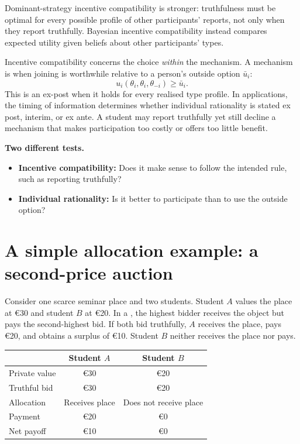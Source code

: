 Dominant-strategy incentive compatibility is stronger: truthfulness must be
optimal for every possible profile of other participants' reports, not only
when they report truthfully. Bayesian incentive compatibility instead compares
expected utility given beliefs about other participants' types.

Incentive compatibility concerns the choice \emph{within} the mechanism. A
mechanism is  when joining is worthwhile
relative to a person's outside option \(\bar u_i\):
\[
u_i(\theta_i,\theta_i,\theta_{-i})\geq\bar u_i.
\]
This is an ex-post  when it holds for every
realised type profile. In applications, the timing of information determines
whether individual rationality is stated ex post, interim, or ex ante. A
student may report truthfully yet still decline a mechanism that makes
participation too costly or offers too little benefit.

\begin{keyidea}
\textbf{Two different tests.}
\begin{itemize}
  \item \textbf{Incentive compatibility:} Does it make sense to follow the intended rule, such as reporting truthfully?
  \item \textbf{Individual rationality:} Is it better to participate than to use the outside option?
\end{itemize}
\end{keyidea}

\section{A simple allocation example: a second-price auction}

Consider one scarce seminar place and two students. Student \(A\) values the
place at \euro30 and student \(B\) at \euro20. In a
, the highest bidder receives the object but
pays the second-highest bid. If both bid truthfully, \(A\) receives the place,
pays \euro20, and obtains a surplus of \euro10. Student \(B\) neither receives
the place nor pays.

\begin{center}
\renewcommand{\arraystretch}{1.2}
\begin{tabular}{lcc}
  \toprule
  & Student \(A\) & Student \(B\)\\
  \midrule
  Private value & \euro30 & \euro20\\
  Truthful bid & \euro30 & \euro20\\
  Allocation & Receives place & Does not receive place\\
  Payment & \euro20 & \euro0\\
  Net payoff & \euro10 & \euro0\\
  \bottomrule
\end{tabular}
\end{center}

